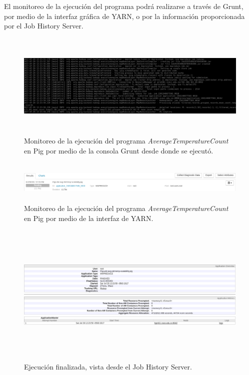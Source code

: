 El monitoreo de la ejecución del programa podrá realizarse a través de Grunt, por medio de la interfaz gráfica de YARN, o por la información proporcionada por el Job History Server.

\begin{figure}[H]
  \centering
      \includegraphics[width=\textwidth, height=2.0in]{fig/03/01}
  \caption{Monitoreo de la ejecución del programa \textit{AverageTemperatureCount} en Pig por medio de la consola Grunt desde donde se ejecutó.}
\end{figure}

\begin{figure}[H]
  \centering
      \includegraphics[width=\textwidth, height=0.8in]{fig/03/02}
  \caption{Monitoreo de la ejecución del programa \textit{AverageTemperatureCount} en Pig por medio de la interfaz de YARN.}
\end{figure}

\begin{figure}[H]
  \centering
      \includegraphics[width=\textwidth, height=2.7in]{fig/03/03}
  \caption{Ejecución finalizada, vista desde el Job History Server.}
\end{figure}